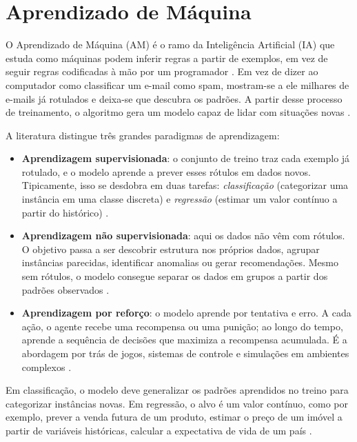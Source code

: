 \section{Aprendizado de Máquina}

O Aprendizado de Máquina (AM) é o ramo da Inteligência Artificial (IA) que estuda como máquinas podem inferir regras a partir de exemplos, em vez de seguir regras codificadas à mão por um programador \cite{mitchell1997}. Em vez de dizer ao computador como classificar um e-mail como spam, mostram-se a ele milhares de e-mails já rotulados e deixa-se que descubra os padrões. A partir desse processo de treinamento, o algoritmo gera um modelo capaz de lidar com situações novas \cite{tan2006}.

A literatura distingue três grandes paradigmas de aprendizagem:

\begin{itemize}
    \item \textbf{Aprendizagem supervisionada}: o conjunto de treino traz cada exemplo já rotulado, e o modelo aprende a prever esses rótulos em dados novos. Tipicamente, isso se desdobra em duas tarefas: \textit{classificação} (categorizar uma instância em uma classe discreta) e \textit{regressão} (estimar um valor contínuo a partir do histórico) \cite{faceli2011}.

    \item \textbf{Aprendizagem não supervisionada}: aqui os dados não vêm com rótulos. O objetivo passa a ser descobrir estrutura nos próprios dados, agrupar instâncias parecidas, identificar anomalias ou gerar recomendações. Mesmo sem rótulos, o modelo consegue separar os dados em grupos a partir dos padrões observados \cite{faceli2011}.

    \item \textbf{Aprendizagem por reforço}: o modelo aprende por tentativa e erro. A cada ação, o agente recebe uma recompensa ou uma punição; ao longo do tempo, aprende a sequência de decisões que maximiza a recompensa acumulada. É a abordagem por trás de jogos, sistemas de controle e simulações em ambientes complexos \cite{cerri2017}.
\end{itemize}

Em classificação, o modelo deve generalizar os padrões aprendidos no treino para categorizar instâncias novas. Em regressão, o alvo é um valor contínuo, como por exemplo, prever a venda futura de um produto, estimar o preço de um imóvel a partir de variáveis históricas, calcular a expectativa de vida de um país \cite{guimaraes2019}.

